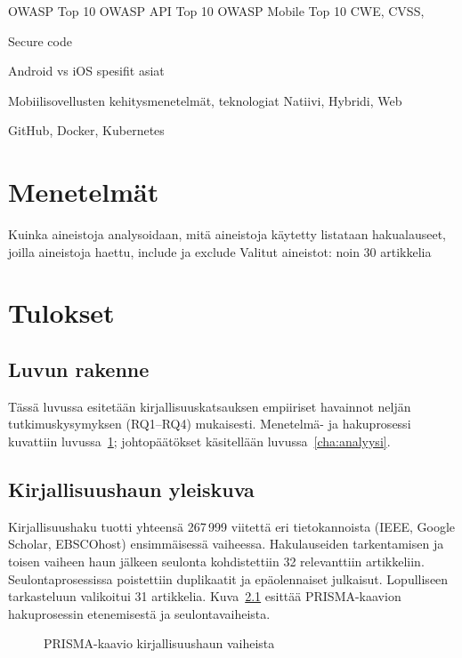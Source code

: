 \documentclass[bscthesis,finnish,oneside,biblatex]{uefcsthesis}
\begin{document}
OWASP Top 10
OWASP API Top 10
OWASP Mobile Top 10
CWE, CVSS,

Secure code

Android vs iOS spesifit asiat

Mobiilisovellusten kehitysmenetelmät, teknologiat
Natiivi, Hybridi, Web

GitHub, Docker, Kubernetes

\chapter{Menetelmät}
\label{cha:menetelmat}
Kuinka aineistoja analysoidaan, mitä aineistoja käytetty
listataan hakualauseet, joilla aineistoja haettu, include ja exclude
Valitut aineistot: noin 30 artikkelia

\chapter{Tulokset}
\label{cha:tulokset}

\section*{Luvun rakenne}
Tässä luvussa esitetään kirjallisuuskatsauksen empiiriset havainnot
neljän tutkimuskysymyksen (RQ1–RQ4) mukaisesti.  Menetelmä- ja
hakuprosessi kuvattiin luvussa~\ref{cha:menetelmat}; johtopäätökset
käsitellään luvussa~\ref{cha:analyysi}.

\section{Kirjallisuushaun yleiskuva}

Kirjallisuushaku tuotti yhteensä 267\,999 viitettä eri tietokannoista (IEEE, Google Scholar, EBSCOhost) ensimmäisessä vaiheessa.
Hakulauseiden tarkentamisen ja toisen vaiheen haun jälkeen seulonta kohdistettiin 32 relevanttiin artikkeliin.
Seulontaprosessissa poistettiin duplikaatit ja epäolennaiset julkaisut. Lopulliseen tarkasteluun valikoitui 31 artikkelia.
Kuva~\ref{fig:prisma} esittää PRISMA-kaavion hakuprosessin etenemisestä ja seulontavaiheista.


\begin{figure}[h]
  \centering
  \caption{PRISMA-kaavio kirjallisuushaun vaiheista}
  \label{fig:prisma}
\end{figure}
\end{document}
